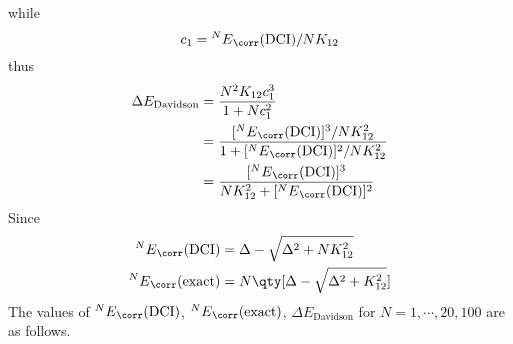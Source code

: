 \documentclass[a4paper]{article}
\begin{document}
while
\begin{equation}\label{key}
c_1 = {^N E}_{\corr}(\text{DCI}) / NK_{12}
\end{equation}
thus
\begin{align}
\Delta E_{\text{Davidson}} &= \dfrac{N^2 K_{12} c_1^3}{1 + N c_1^2} \notag\\
&= \dfrac{[{^N E}_{\corr}(\text{DCI})]^3 / NK_{12}^2}{1 + [{^N E}_{\corr}(\text{DCI})]^2 / NK_{12}^2} \notag\\
&= \dfrac{[{^N E}_{\corr}(\text{DCI})]^3}{NK_{12}^2 + [{^N E}_{\corr}(\text{DCI})]^2 }
\end{align}
Since
\begin{align}
{^N E}_{\corr}(\text{DCI}) &= \Delta - \sqrt{\Delta^2 + N K_{12}^2} \\
{^N E}_{\corr}(\text{exact}) &= N\qty[\Delta - \sqrt{\Delta^2 + K_{12}^2}]
\end{align}
\newpage
The values of $ {^N E}_{\corr}(\text{DCI}) $, $ {^N E}_{\corr}(\text{exact}) $, $ \Delta E_{\text{Davidson}} $ for $ N=1,\cdots, 20, 100 $ are as follows.
\end{document}
